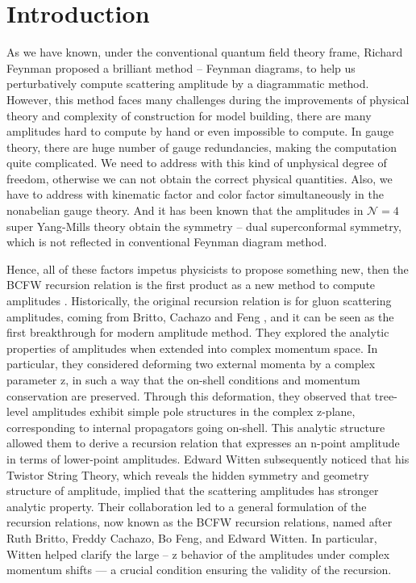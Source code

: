 \documentclass[12pt]{article}
\numberwithin{equation}{section}
\begin{document}
\section{Introduction}
As we have known,
under the conventional quantum field theory frame, Richard Feynman proposed a brilliant method -- Feynman diagrams, to help us perturbatively compute scattering amplitude by a
diagrammatic method. However, this method faces many challenges during the improvements of physical theory and complexity of construction for model building, there are many
amplitudes hard to compute by hand or even impossible to compute. In gauge theory, there are huge number of gauge redundancies, making the computation quite complicated.
We need to address with this kind of unphysical degree of freedom, otherwise we can not obtain the correct physical quantities. Also, we have to address with kinematic factor and color factor simultaneously in the nonabelian gauge theory.
And it has been known that the amplitudes in $\mathcal{N}=4$ super Yang-Mills theory obtain the symmetry -- dual superconformal symmetry\cite{Drummond:2008vq}, which is not reflected in conventional Feynman diagram method. 

Hence, all of these factors impetus physicists to propose something new, then the BCFW recursion relation is the first product as a new method to compute amplitudes . Historically, the original recursion relation is for gluon scattering amplitudes, coming from Britto, Cachazo and Feng \cite{Britto:2004ap},
and it can be seen as the first breakthrough for modern amplitude method. They explored the analytic properties of amplitudes when extended into complex momentum space. In particular, they considered deforming two external momenta by a complex parameter z, in such a way that the on-shell conditions and momentum conservation are preserved.
Through this deformation, they observed that tree-level amplitudes exhibit simple pole structures in the complex 
z-plane, corresponding to internal propagators going on-shell. This analytic structure allowed them to derive a recursion relation that expresses an 
n-point amplitude in terms of lower-point amplitudes. Edward Witten subsequently noticed that his Twistor String Theory\cite{Witten:2003nn}, which reveals the hidden symmetry and geometry structure of amplitude, implied that the scattering amplitudes has stronger 
analytic property. Their collaboration led to a general formulation of the recursion relations, now known as the BCFW recursion relations\cite{Britto:2005fq}, named after Ruth Britto, Freddy Cachazo, Bo Feng, and Edward Witten.
In particular, Witten helped clarify the large -- z behavior of the amplitudes under complex momentum shifts --- a crucial condition ensuring the validity of the recursion. 
\end{document}
